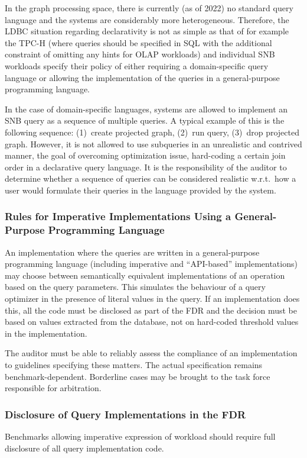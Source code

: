 In the graph processing space, there is currently (as of 2022) no standard query language and the systems are considerably more heterogeneous.
Therefore, the LDBC situation regarding declarativity is not as simple as that of for example the \mbox{TPC-H} (where queries should be specified in SQL with the additional constraint of omitting any hints for OLAP workloads) and individual SNB workloads specify their policy of either requiring a domain-specific query language or allowing the implementation of the queries in a general-purpose programming language.

In the case of domain-specific languages, systems are allowed to implement an SNB query as a sequence of multiple queries.
A typical example of this is the following sequence:
(1)~create projected graph,
(2)~run query,
(3)~drop projected graph.
However, it is not allowed to use subqueries in an unrealistic and contrived manner, \ie the goal of overcoming optimization issue, \eg hard-coding a certain join order in a declarative query language.
It is the responsibility of the auditor to determine whether a sequence of queries can be considered realistic w.r.t.\ how a user would formulate their queries in the language provided by the system.

\subsubsection{Rules for Imperative Implementations Using a General-Purpose Programming Language}
An implementation where the queries are written in a general-purpose programming language (including imperative and ``API-based'' implementations) may choose between semantically equivalent implementations of an operation based on the query parameters. This simulates the behaviour of a query optimizer in the presence of literal values in the query. If an implementation does this, all the code must be disclosed as part of the FDR and the decision must be based on values extracted from the database, not on hard-coded threshold values in the implementation.

The auditor must be able to reliably assess the compliance of an implementation to guidelines specifying these matters. The actual specification remains benchmark-dependent. Borderline cases may be brought to the task force responsible for arbitration.


\subsubsection{Disclosure of Query Implementations in the FDR}
Benchmarks allowing imperative expression of workload should require full disclosure of all query implementation code.

